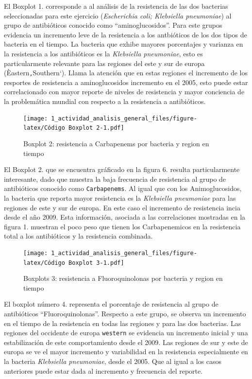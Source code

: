 \documentclass[
]{article}
\begin{document}
El Boxplot 1. corresponde a al análisis de la resistencia de las dos
bacterias seleccionadas para este ejercicio (\emph{Escherichia coli;
Klebsiella pneumoniae}) al grupo de antibióticos conocido como
``aminoglucosidos''. Para este grupos evidencia un incremento leve de la
resistencia a los antbióticos de los dos tipos de bacteria en el tiempo.
La bacteria que exhibe mayores porcentajes y varianza en la resistencia
a los antibióticos es la \emph{Klebsiella pneumoniae}, esto es
particularmente relevante para las regiones del este y sur de europa
(Èastern\texttt{,}Southern`). Llama la atención que en estas regiones el
incremento de los resportes de resistencia a aminoglucosidos incremento
en el 2005, esto puede estar correlacionado con mayor reporte de niveles
de resistencia y mayor conciencia de la problemática mundial con
respecto a la resistencia a antibióticos.

\begin{figure}
\centering
\texttt{[image: 1\_actividad\_analisis\_general\_files/figure-latex/Código Boxplot 2-1.pdf]}
\caption{Boxplot 2: resistencia a Carbapenems por bacteria y region en
tiempo}
\end{figure}

El Boxplot 2. que se encuentra gráficado en la figura 6. resulta
particularmente interesante, dado que muestra la baja frecuencia de
resistencia al grupo de antibióticos conocido como \texttt{Carbapenems}.
Al igual que con los Animoglucosidos, la bacteria que reporta mayor
resistencia es la \emph{Klebsiella pneumoniae} para las regiones de este
y sur de europa. En este caso el incremento de resistencia incia desde
el año 2009. Esta información, asociada a las correlaciones mostradas en
la figura 1. muestran el poco peso que tienen los Carbapenemicos en la
resistencia total a los antibióticos y la resistencia combinada.

\begin{figure}
\centering
\texttt{[image: 1\_actividad\_analisis\_general\_files/figure-latex/Código Boxplot 3-1.pdf]}
\caption{Boxplots 3: resistencia a Fluoroquinolonas por bacteria y
region en tiempo}
\end{figure}

El boxplot número 4. representa el porcentaje de resistencia al grupo de
antibióticos ``Fluoroquinolonas''. Respecto a este grupo, se observa un
incremento en el tiempo de la resistencia en todas las regiones y para
las dos bacterias. Las regiones del occidente de europa \texttt{western}
se evidencia un incremento inicial y una estabilización de este
comportamiento desde el 2009. Las regiones de sur y este de europa se ve
el mayor incremento y variabilidad en la resistencia especialmente en la
bacteria \emph{Klebsiella pneumoniae}, desde el 2005. Que al igual a los
casos anteriores puede estar dada al incremento y frecuencia del
reporte.
\end{document}
